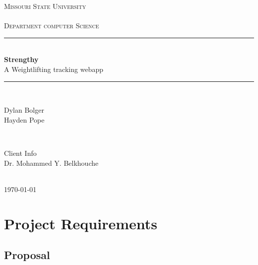 \documentclass[12pt]{article}
\begin{document}
\begin{titlepage}

\newcommand{\HRule}{\rule{\linewidth}{0.5mm}}

\center

\textsc{\LARGE Missouri State University\\~\\Department computer Science}\\[1.0cm]

\HRule \\[0.4cm]
{ \huge \bfseries Strengthy}\\[0.4cm]
{ \large A Weightlifting tracking webapp}\\[0.4cm]
\HRule \\[1.5cm]

\begin{minipage}{0.4\textwidth}
\begin{flushleft} \large
Dylan Bolger \\ Hayden Pope
\end{flushleft}
\end{minipage}
~
\begin{minipage}{0.4\textwidth}
\begin{flushright} \large
Client Info \\
Dr. Mohammed Y. Belkhouche\\

\end{flushright}
\end{minipage}\\[2cm]

{\large \today}\\[2cm]

\end{titlepage}

\newpage
\tableofcontents

\newpage

\section{Project Requirements}
\subsection{Proposal}

\endgroup
\end{document}

